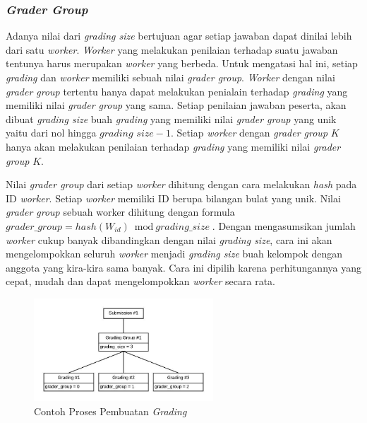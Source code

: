 \subsubsection{\textit{Grader Group}}

\par Adanya nilai dari \textit{grading size} bertujuan agar setiap jawaban dapat dinilai lebih dari satu \textit{worker}. \textit{Worker} yang melakukan penilaian terhadap suatu jawaban tentunya harus merupakan \textit{worker} yang berbeda. Untuk mengatasi hal ini, setiap \textit{grading} dan \textit{worker} memiliki sebuah nilai \textit{grader group}. \textit{Worker} dengan nilai \textit{grader group} tertentu hanya dapat melakukan penialain terhadap \textit{grading} yang memiliki nilai \textit{grader group} yang sama. Setiap penilaian jawaban peserta, akan dibuat \textit{grading size} buah \textit{grading} yang memiliki nilai \textit{grader group} yang unik yaitu dari nol hingga $\textit{grading size} - 1$. Setiap \textit{worker} dengan \textit{grader group} $K$ hanya akan melakukan penilaian terhadap \textit{grading} yang memiliki nilai \textit{grader group} $K$.

\par Nilai \textit{grader group} dari setiap \textit{worker} dihitung dengan cara melakukan \textit{hash} pada ID \textit{worker}. Setiap \textit{worker} memiliki ID berupa bilangan bulat yang unik. Nilai \textit{grader group} sebuah worker dihitung dengan formula $\textit{grader\_group} = hash(W_{id}) \bmod \textit{grading\_size}$. Dengan mengasumsikan jumlah \textit{worker} cukup banyak dibandingkan dengan nilai \textit{grading size}, cara ini akan mengelompokkan seluruh \textit{worker} menjadi \textit{grading size} buah kelompok dengan anggota yang kira-kira sama banyak. Cara ini dipilih karena perhitungannya yang cepat, mudah dan dapat mengelompokkan \textit{worker} secara rata.

\begin{figure}[ht!]
    \centering
    \includegraphics[width=0.6\textwidth]{images/grading-example-1}
    \caption{Contoh Proses Pembuatan \textit{Grading}}
    \label{fig:grading-example-1}
\end{figure}

